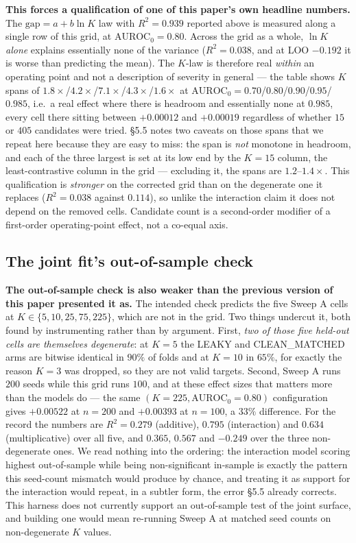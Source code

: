 \documentclass[10pt]{article} %
\begin{document}
\textbf{This forces a qualification of one of this paper's own headline
numbers.} The $\text{gap}=a+b\ln K$ law with $R^2=0.939$ reported above is
measured along a single row of this grid, at $\text{AUROC}_0=0.80$. Across the
grid as a whole, $\ln K$ \emph{alone} explains essentially none of the variance
($R^2=0.038$, and at LOO $-0.192$ it is worse than predicting the mean). The
$K$-law is therefore real \emph{within} an operating point and not a
description of severity in general --- the table shows $K$ spans of
$1.8\times$/$4.2\times$/$7.1\times$/$4.3\times$/$1.6\times$ at
$\text{AUROC}_0=0.70$/$0.80$/$0.90$/$0.95$/$0.985$, i.e.\ a real effect where
there is headroom and essentially none at $0.985$, every cell there sitting
between $+0.00012$ and $+0.00019$ regardless of whether $15$ or $405$
candidates were tried. §5.5 notes two caveats on those spans that we repeat
here because they are easy to miss: the span is \emph{not} monotone in
headroom, and each of the three largest is set at its low end by the $K=15$
column, the least-contrastive column in the grid --- excluding it, the spans
are $1.2$--$1.4\times$. This
qualification is \emph{stronger} on the corrected grid than on the degenerate
one it replaces ($R^2=0.038$ against $0.114$), so unlike the interaction claim
it does not depend on the removed cells. Candidate count is a second-order
modifier of a first-order operating-point effect, not a co-equal axis.

\subsection{The joint fit's out-of-sample check}

\textbf{The out-of-sample check is also
weaker than the previous version of this paper presented it as.} The intended
check predicts the five Sweep A cells at $K\in\{5,10,25,75,225\}$, which are
not in the grid. Two things undercut it, both found by instrumenting rather
than by argument. First, \emph{two of those five held-out cells are themselves
degenerate}: at $K=5$ the LEAKY and CLEAN\_MATCHED arms are bitwise identical
in $90\%$ of folds and at $K=10$ in $65\%$, for exactly the reason $K=3$ was
dropped, so they are not valid targets. Second, Sweep A runs $200$ seeds while
this grid runs $100$, and at these effect sizes that matters more than the
models do --- the same $(K{=}225,\text{AUROC}_0{=}0.80)$ configuration gives
$+0.00522$ at $n=200$ and $+0.00393$ at $n=100$, a $33\%$ difference. For the
record the numbers are $R^2=0.279$ (additive), $0.795$ (interaction) and
$0.634$ (multiplicative) over all five, and $0.365$, $0.567$ and $-0.249$ over
the three non-degenerate ones. We read nothing into the ordering: the
interaction model scoring highest out-of-sample while being non-significant
in-sample is exactly the pattern this seed-count mismatch would produce by
chance, and treating it as support for the interaction would repeat, in a
subtler form, the error §5.5 already corrects. This harness does not
currently support an out-of-sample test of the joint surface, and building one
would mean re-running Sweep A at matched seed counts on non-degenerate $K$
values.
\end{document}

